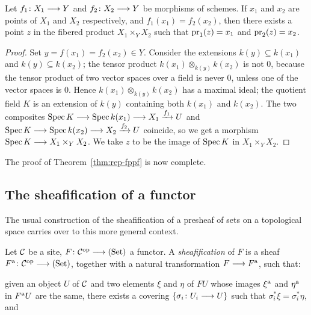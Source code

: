 \begin{2   CONTRAVARIANT FUNCTORS}
\begin{2.3 Sheaves in Grothendieck topologies}
\begin{lemma}\label{lem:product-set}
Let $f_1 \colon X_1 \arr Y$ and $f_2 \colon X_2 \arr Y$ be morphisms of schemes. If $x_1$ and $x_2$ are points  of $X_1$ and $X_2$ respectively, and $f_1(x_1) = f_2(x_2)$, then there exists a point $z$ in the fibered product $X_1 \times_{Y} X_2$ such that $\operatorname{pr}_1(z) = x_1$ and $\operatorname{pr}_2(z) = x_2$.
\end{lemma}

\begin{proof}

Set $y = f(x_1) = f_2(x_2) \in Y$. Consider the extensions $k(y) \subseteq k(x_1)$ and $k(y) \subseteq k(x_2)$; the tensor product $k(x_1) \otimes_{k(y)} k(x_2)$ is not 0, because the tensor product of two vector spaces over a field is never $0$, unless one of the vector spaces is $0$. Hence $k(x_1) \otimes_{k(y)} k(x_2)$ has a maximal ideal; the quotient field $K$ is an extension of $k(y)$ containing both $k(x_1)$ and $k(x_2)$. The two composites $\spec K \arr \spec k(x_1) \arr X_1 \xrightarrow{f_1} U$ and $\spec K \arr \spec k(x_2)\arr X_2 \xrightarrow{f_2} U$ coincide, so we get a morphism $\spec K \arr X_{1} \times_Y X_{2}$. We take $z$ to be the image of $\operatorname{Spec} K$ in $X_1 \times_{Y} X_2$.
\end{proof}

The proof of Theorem~\ref{thm:rep-fppf} is now complete.



\subsection{The sheafification of a functor}

The usual construction of the sheafification of a presheaf of sets on a topological space carries over to this more general context.

\begin{definition}\label{def:sheafification}
Let $\mathcal{C}$ be a site, $F \colon \cC\op \arr \catset$ a functor. A \emph{sheafification}%
 of $F$ is a sheaf $F\ass \colon \cC\op \arr \catset$, together with a natural transformation $F \arr F\ass$, such that:

\begin{enumeratei}

\item given an object $U$ of $\mathcal{C}$ and two elements $\xi$ and $\eta$ of $FU$ whose images $\xi^\mathrm{a}$ and $\eta^\mathrm{a}$ in  $F^\mathrm{a} U$ are the same, there exists a covering $\{\sigma_i\colon U_i \arr U\}$ such that $\sigma_i^* \xi = \sigma_i^* \eta$, and


\end{enumeratei}
\end{definition}
\end{2.3 Sheaves in Grothendieck topologies}
\end{2   CONTRAVARIANT FUNCTORS}
